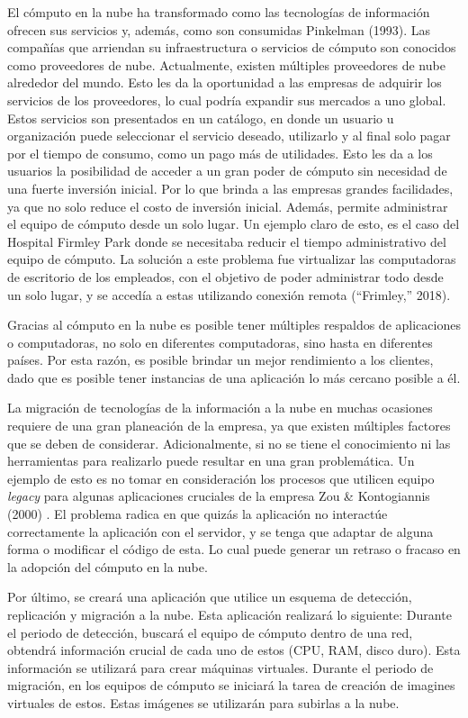 \documentclass[12pt,twoside]{reedthesis}
\theoremstyle{definition}
\theoremstyle{definition}
\theoremstyle{definition}
\theoremstyle{remark}
\begin{document}
El cómputo en la nube ha transformado como las tecnologías de
información ofrecen sus servicios y, además, como son consumidas
Pinkelman (1993). Las compañías que arriendan su infraestructura o
servicios de cómputo son conocidos como proveedores de nube.
Actualmente, existen múltiples proveedores de nube alrededor del mundo.
Esto les da la oportunidad a las empresas de adquirir los servicios de
los proveedores, lo cual podría expandir sus mercados a uno global.
Estos servicios son presentados en un catálogo, en donde un usuario u
organización puede seleccionar el servicio deseado, utilizarlo y al
final solo pagar por el tiempo de consumo, como un pago más de
utilidades. Esto les da a los usuarios la posibilidad de acceder a un
gran poder de cómputo sin necesidad de una fuerte inversión inicial. Por
lo que brinda a las empresas grandes facilidades, ya que no solo reduce
el costo de inversión inicial. Además, permite administrar el equipo de
cómputo desde un solo lugar. Un ejemplo claro de esto, es el caso del
Hospital Firmley Park donde se necesitaba reducir el tiempo
administrativo del equipo de cómputo. La solución a este problema fue
virtualizar las computadoras de escritorio de los empleados, con el
objetivo de poder administrar todo desde un solo lugar, y se accedía a
estas utilizando conexión remota (``Frimley,'' 2018).

Gracias al cómputo en la nube es posible tener múltiples respaldos de
aplicaciones o computadoras, no solo en diferentes computadoras, sino
hasta en diferentes países. Por esta razón, es posible brindar un mejor
rendimiento a los clientes, dado que es posible tener instancias de una
aplicación lo más cercano posible a él.

La migración de tecnologías de la información a la nube en muchas
ocasiones requiere de una gran planeación de la empresa, ya que existen
múltiples factores que se deben de considerar. Adicionalmente, si no se
tiene el conocimiento ni las herramientas para realizarlo puede resultar
en una gran problemática. Un ejemplo de esto es no tomar en
consideración los procesos que utilicen equipo \emph{legacy} para
algunas aplicaciones cruciales de la empresa Zou \& Kontogiannis (2000)
. El problema radica en que quizás la aplicación no interactúe
correctamente la aplicación con el servidor, y se tenga que adaptar de
alguna forma o modificar el código de esta. Lo cual puede generar un
retraso o fracaso en la adopción del cómputo en la nube.

Por último, se creará una aplicación que utilice un esquema de
detección, replicación y migración a la nube. Esta aplicación realizará
lo siguiente: Durante el periodo de detección, buscará el equipo de
cómputo dentro de una red, obtendrá información crucial de cada uno de
estos (CPU, RAM, disco duro). Esta información se utilizará para crear
máquinas virtuales. Durante el periodo de migración, en los equipos de
cómputo se iniciará la tarea de creación de imagines virtuales de estos.
Estas imágenes se utilizarán para subirlas a la nube.
\end{document}
